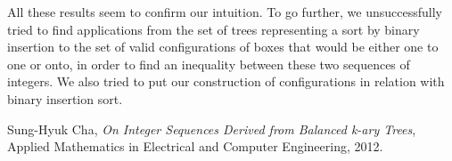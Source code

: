 \documentclass[11pt, a4paper]{article}
\begin{document}
All these results seem to confirm our intuition.  To go further, we
unsuccessfully tried to find applications from the set of trees representing a
sort by binary insertion to the set of valid configurations of boxes that would
be either one to one or onto, in order to find an inequality between these two
sequences of integers.  We also tried to put our construction of configurations
in relation with binary insertion sort. 

\begin{thebibliography}{1}

Sung-Hyuk Cha, {\em On Integer Sequences Derived from Balanced k-ary Trees}, Applied Mathematics in Electrical and Computer Engineering, 2012.

\end{thebibliography}
\end{document}

